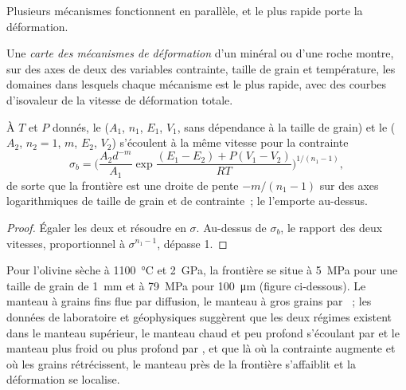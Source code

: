 Plusieurs mécanismes fonctionnent en parallèle, et le plus rapide porte la déformation.

\begin{definition}\label{def:b3:deformation-mechanisms:deformation-map}
Une \emph{carte des mécanismes de déformation} d'un
minéral ou d'une roche montre, sur des axes de deux des variables contrainte, taille de grain et
température, les domaines dans lesquels chaque mécanisme est le plus rapide, avec des courbes d'isovaleur
de la vitesse de déformation totale.
\end{definition}

\begin{proposition}\label{prop:b3:deformation-mechanisms:boundary}
À $T$ et $P$ donnés, le  ($A_1$, $n_1$, $E_1$, $V_1$, sans
dépendance à la taille de grain) et le  ($A_2$, $n_2 = 1$, $m$, $E_2$, $V_2$)
s'écoulent à la même vitesse pour la contrainte
\[
  \sigma_b = \biggl(\frac{A_2d^{-m}}{A_1}
  \exp\frac{(E_1 - E_2) + P(V_1 - V_2)}{RT}\biggr)^{1/(n_1 - 1)} ,
\]
de sorte que la frontière est une droite de pente $-m/(n_1 - 1)$ sur des axes logarithmiques
de taille de grain et de contrainte~; le  l'emporte au-dessus.
\end{proposition}

\begin{proof}
Égaler les deux  et résoudre en $\sigma$. Au-dessus de $\sigma_b$, le rapport
des deux vitesses, proportionnel à $\sigma^{n_1 - 1}$, dépasse 1.
\end{proof}

Pour l'olivine sèche à \qty{1100}{\celsius} et \qty{2}{GPa}, la frontière se situe à
\qty{5}{MPa} pour une taille de grain de \qty{1}{mm} et à \qty{79}{MPa} pour
\qty{100}{\micro m} (figure ci-dessous). Le manteau à grains fins flue par diffusion,
le manteau à gros grains par ~; les données de laboratoire et géophysiques suggèrent
que les deux régimes existent dans le manteau supérieur, le manteau chaud et peu profond s'écoulant par
 et le manteau plus froid ou plus profond par , et que là où
la contrainte augmente et où les grains rétrécissent, le manteau près de la frontière s'affaiblit
et la déformation se localise.

